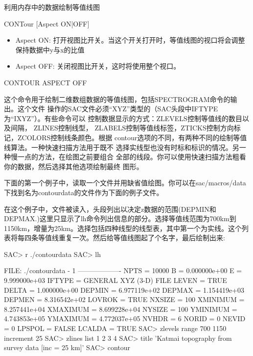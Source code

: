 \label{cmd:contour}

利用内存中的数据绘制等值线图

CONTour [Aspect ON|OFF]

\begin{itemize}
\item Aspect ON: 打开视图比开关。当这个开关打开时，等值线图的视口将会调整保持数据中y与x的比值
\item Aspect OFF: 关闭视图比开关，这时将使用整个视口。
\end{itemize}

CONTOUR  ASPECT  OFF

这个命令用于绘制二维数组数据的等值线图，包括SPECTROGRAM命令的输出。这个文件
操作的SAC文件必须``XYZ''类型的（SAC头段中IFTYPE为``IXYZ''）。有些命令可以
控制数据显示的方式：ZLEVELS控制等值线的数目以及间隔， ZLINES控制线型，
ZLABELS控制等值线标签，ZTICKS控制方向标记，ZCOLORS控制线条颜色。根据
contour选项的不同，有两种不同的绘制等值线算法。一种快速扫描方法用于既不
选择实线型也没有时标和标识的情况。另一种慢一点的方法，在绘图之前要组合
全部的线段。你可以使用快速扫描方法粗看你的数据，然后选择其他选项绘制最终
图形。

下面的第一个例子中，读取一个文件并用缺省值绘图。你可以在sac/macros/data下找到名为contourdata的文件作为下面的例子文件。

在这个例子中，文件被读入，头段列出以决定z数据的范围(DEPMIN和DEPMAX.)这里只显示了lh命令列出信息的部分。选择等值线范围为700km到1150km，增量为25km。选择包括四种线型的线型表，其中第一个为实线。这个列表将每四条等值线重复一次。然后给等值线图起了个名字，最后绘制出来:
\begin{SACCode}
SAC> r ./contourdata 
SAC> lh
  
  FILE: ./contourdata - 1
 -------------------
         NPTS = 10000
            B = 0.000000e+00
            E = 9.999000e+03
       IFTYPE = GENERAL XYZ (3-D) FILE
        LEVEN = TRUE
        DELTA = 1.000000e+00
       DEPMIN = 6.977119e+02
       DEPMAX = 1.154419e+03
       DEPMEN = 8.316542e+02
       LOVROK = TRUE
       NXSIZE = 100
     XMINIMUM = 8.257441e+04
     XMAXIMUM = 8.699228e+04
       NYSIZE = 100
     YMINIMUM = 4.743853e+05
     YMAXIMUM = 4.772037e+05
        NVHDR = 6
        NORID = 0
        NEVID = 0
       LPSPOL = FALSE
       LCALDA = TRUE
SAC> zlevels range 700 1150 increment 25
SAC> zlines list 1 2 3 4
SAC> title 'Katmai topography from survey data [inc = 25 km]'
SAC> contour
\end{SACCode}

